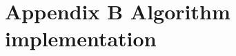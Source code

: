 \documentclass[12pt]{article}
\begin{document}
\section*{Appendix B Algorithm implementation}


%






\end{document}
